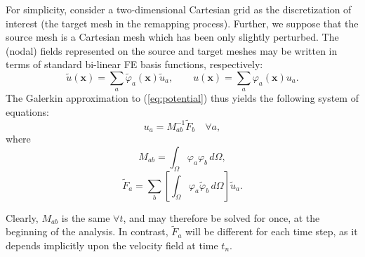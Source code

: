 \documentclass[12pt]{article}
\begin{document}
For simplicity, consider a two-dimensional Cartesian grid as the discretization of interest (the target mesh in the remapping process). Further, we suppose that the source mesh is a Cartesian mesh which has been only slightly perturbed. The (nodal) fields represented on the source and target meshes may be written in terms of standard bi-linear FE basis functions, respectively:
\begin{equation}
  \tilde{u} (\mathbf{x}) = \sum_a \tilde{\varphi}_a (\mathbf{x}) \tilde{u}_a, \qquad u (\mathbf{x}) = \sum_a \varphi_a (\mathbf{x}) u_a.
\end{equation}
The Galerkin approximation to (\ref{eq:potential}) thus yields the following system of equations:
\begin{equation}
  u_a = M_{ab}^{-1} \tilde{F}_{b} \quad \forall a,
  \label{eq:remap}
\end{equation}
where
\begin{equation}
  M_{ab} = \int_\Omega \varphi_a \varphi_b \, d \Omega,
  \label{eq:mass}
\end{equation}
\begin{equation}
  \tilde{F}_{a} = \sum_b \left[ \int_\Omega \varphi_a \tilde{\varphi}_b \, d \Omega \right] \tilde{u}_a.
\end{equation}

Clearly, $M_{ab}$ is the same $\forall t$, and may therefore be solved for once, at the beginning of the analysis. In contrast, $\tilde{F}_{a}$ will be different for each time step, as it depends implicitly upon the velocity field at time $t_n$.
\end{document}
